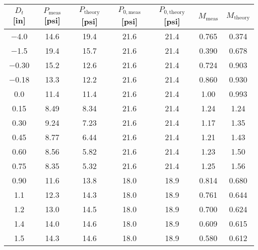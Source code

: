 \begin{tabular}{ccccccc}
\toprule
$D_t$ [\unit{in}] & $P_\text{meas}$ [\unit{psi}] & $P_\text{theory}$ [\unit{psi}] & $P_{0,\text{meas}}$ [\unit{psi}] & $P_{0,\text{theory}}$ [\unit{psi}] & $M_\text{meas}$ & $M_\text{theory}$ \\
\midrule
\num{-4.0} & \num{14.6} & \num{19.4} & \num{21.6} & \num{21.4} & \num{0.765} & \num{0.374} \\ 
\num{-1.5} & \num{19.4} & \num{15.7} & \num{21.6} & \num{21.4} & \num{0.390} & \num{0.678} \\ 
\num{-0.30} & \num{15.2} & \num{12.6} & \num{21.6} & \num{21.4} & \num{0.724} & \num{0.903} \\ 
\num{-0.18} & \num{13.3} & \num{12.2} & \num{21.6} & \num{21.4} & \num{0.860} & \num{0.930} \\ 
\num{0.0} & \num{11.4} & \num{11.4} & \num{21.6} & \num{21.4} & \num{1.00} & \num{0.993} \\ 
\num{0.15} & \num{8.49} & \num{8.34} & \num{21.6} & \num{21.4} & \num{1.24} & \num{1.24} \\ 
\num{0.30} & \num{9.24} & \num{7.23} & \num{21.6} & \num{21.4} & \num{1.17} & \num{1.35} \\ 
\num{0.45} & \num{8.77} & \num{6.44} & \num{21.6} & \num{21.4} & \num{1.21} & \num{1.43} \\ 
\num{0.60} & \num{8.56} & \num{5.82} & \num{21.6} & \num{21.4} & \num{1.23} & \num{1.50} \\ 
\num{0.75} & \num{8.35} & \num{5.32} & \num{21.6} & \num{21.4} & \num{1.25} & \num{1.56} \\ 
\num{0.90} & \num{11.6} & \num{13.8} & \num{18.0} & \num{18.9} & \num{0.814} & \num{0.680} \\ 
\num{1.1} & \num{12.3} & \num{14.3} & \num{18.0} & \num{18.9} & \num{0.761} & \num{0.644} \\ 
\num{1.2} & \num{13.0} & \num{14.5} & \num{18.0} & \num{18.9} & \num{0.700} & \num{0.624} \\ 
\num{1.4} & \num{14.0} & \num{14.6} & \num{18.0} & \num{18.9} & \num{0.609} & \num{0.615} \\ 
\num{1.5} & \num{14.3} & \num{14.6} & \num{18.0} & \num{18.9} & \num{0.580} & \num{0.612} \\ 
\bottomrule
\end{tabular}